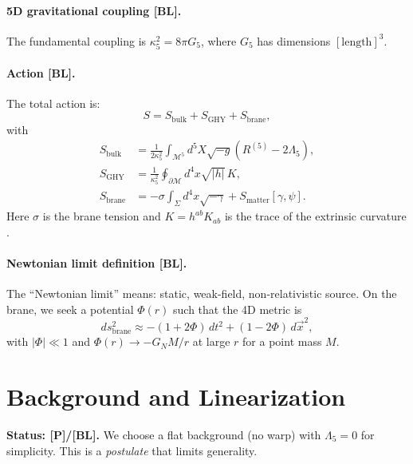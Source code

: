 \documentclass[11pt,a4paper]{article}
\newcommand{\tagBL}{\textcolor{blue!70!black}{[BL]}}
\newcommand{\tagP}{\textcolor{orange!80!black}{[P]}}
\begin{document}
\paragraph{5D gravitational coupling \tagBL{}.}
The fundamental coupling is $\kappa_5^2 = 8\pi G_5$, where $G_5$ has dimensions $[\text{length}]^3$.

\paragraph{Action \tagBL{}.}
The total action is:
\begin{equation}
    S = S_{\text{bulk}} + S_{\text{GHY}} + S_{\text{brane}},
    \label{eq:total_action}
\end{equation}
with
\begin{align}
    S_{\text{bulk}} &= \frac{1}{2\kappa_5^2} \int_{\mathcal{M}^5} d^5X \sqrt{-g} \left( R^{(5)} - 2\Lambda_5 \right), \label{eq:S_bulk} \\
    S_{\text{GHY}} &= \frac{1}{\kappa_5^2} \oint_{\partial\mathcal{M}} d^4x \sqrt{|h|} \, K, \label{eq:S_GHY} \\
    S_{\text{brane}} &= -\sigma \int_\Sigma d^4x \sqrt{-\gamma} + S_{\text{matter}}[\gamma, \psi]. \label{eq:S_brane}
\end{align}
Here $\sigma$ is the brane tension and $K = h^{ab} K_{ab}$ is the trace of the extrinsic curvature \cite{York1972,GH1977}.

\paragraph{Newtonian limit definition \tagBL{}.}
The ``Newtonian limit'' means: static, weak-field, non-relativistic source.
On the brane, we seek a potential $\Phi(r)$ such that the 4D metric is
\begin{equation}
    ds^2_{\text{brane}} \approx -(1 + 2\Phi)\,dt^2 + (1 - 2\Phi)\,d\vec{x}^2,
\end{equation}
with $|\Phi| \ll 1$ and $\Phi(r) \to -G_N M / r$ at large $r$ for a point mass $M$.

\section{Background and Linearization}
\label{sec:linearize}

\begin{statusbox}
\textbf{Status: \tagP{}/\tagBL{}.}
We choose a flat background (no warp) with $\Lambda_5 = 0$ for simplicity.
This is a \emph{postulate} that limits generality.
\end{statusbox}
\end{document}

